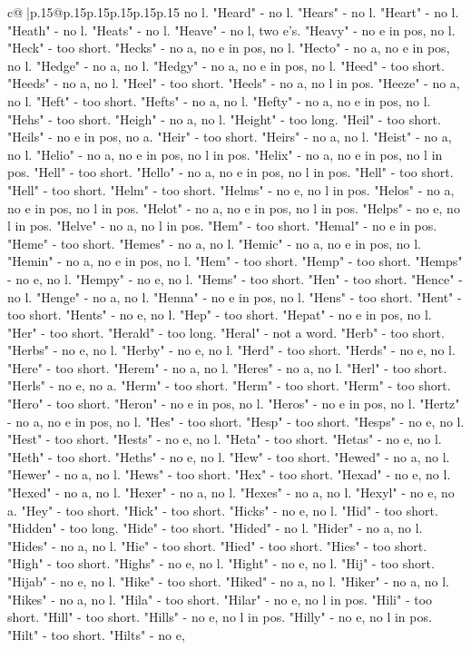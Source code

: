 \documentclass{article}
\begin{document}
{\begin{supertabular}{c@{$\;$}|p{.15\linewidth}@{}p{.15\linewidth}p{.15\linewidth}p{.15\linewidth}p{.15\linewidth}p{.15\linewidth}}
{{{no l. "Heard" {-} no l. "Hears" {-} no l. "Heart" {-} no l. "Heath" {-} no l. "Heats" {-} no l. "Heave" {-} no l, two e's. "Heavy" {-} no e in pos, no l. "Heck" {-} too short. "Hecks" {-} no a, no e in pos, no l. "Hecto" {-} no a, no e in pos, no l. "Hedge" {-} no a, no l. "Hedgy" {-} no a, no e in pos, no l. "Heed" {-} too short. "Heeds" {-} no a, no l. "Heel" {-} too short. "Heels" {-} no a, no l in pos. "Heeze" {-} no a, no l. "Heft" {-} too short. "Hefts" {-} no a, no l. "Hefty" {-} no a, no e in pos, no l. "Hehs" {-} too short. "Heigh" {-} no a, no l. "Height" {-} too long. "Heil" {-} too short. "Heils" {-} no e in pos, no a. "Heir" {-} too short. "Heirs" {-} no a, no l. "Heist" {-} no a, no l. "Helio" {-} no a, no e in pos, no l in pos. "Helix" {-} no a, no e in pos, no l in pos. "Hell" {-} too short. "Hello" {-} no a, no e in pos, no l in pos. "Hell" {-} too short. "Hell" {-} too short. "Helm" {-} too short. "Helms" {-} no e, no l in pos. "Helos" {-} no a, no e in pos, no l in pos. "Helot" {-} no a, no e in pos, no l in pos. "Helps" {-} no e, no l in pos. "Helve" {-} no a, no l in pos. "Hem" {-} too short. "Hemal" {-} no e in pos. "Heme" {-} too short. "Hemes" {-} no a, no l. "Hemic" {-} no a, no e in pos, no l. "Hemin" {-} no a, no e in pos, no l. "Hem" {-} too short. "Hemp" {-} too short. "Hemps" {-} no e, no l. "Hempy" {-} no e, no l. "Hems" {-} too short. "Hen" {-} too short. "Hence" {-} no l. "Henge" {-} no a, no l. "Henna" {-} no e in pos, no l. "Hens" {-} too short. "Hent" {-} too short. "Hents" {-} no e, no l. "Hep" {-} too short. "Hepat" {-} no e in pos, no l. "Her" {-} too short. "Herald" {-} too long. "Heral" {-} not a word. "Herb" {-} too short. "Herbs" {-} no e, no l. "Herby" {-} no e, no l. "Herd" {-} too short. "Herds" {-} no e, no l. "Here" {-} too short. "Herem" {-} no a, no l. "Heres" {-} no a, no l. "Herl" {-} too short. "Herls" {-} no e, no a. "Herm" {-} too short. "Herm" {-} too short. "Herm" {-} too short. "Hero" {-} too short. "Heron" {-} no e in pos, no l. "Heros" {-} no e in pos, no l. "Hertz" {-} no a, no e in pos, no l. "Hes" {-} too short. "Hesp" {-} too short. "Hesps" {-} no e, no l. "Hest" {-} too short. "Hests" {-} no e, no l. "Heta" {-} too short. "Hetas" {-} no e, no l. "Heth" {-} too short. "Heths" {-} no e, no l. "Hew" {-} too short. "Hewed" {-} no a, no l. "Hewer" {-} no a, no l. "Hews" {-} too short. "Hex" {-} too short. "Hexad" {-} no e, no l. "Hexed" {-} no a, no l. "Hexer" {-} no a, no l. "Hexes" {-} no a, no l. "Hexyl" {-} no e, no a. "Hey" {-} too short. "Hick" {-} too short. "Hicks" {-} no e, no l. "Hid" {-} too short. "Hidden" {-} too long. "Hide" {-} too short. "Hided" {-} no l. "Hider" {-} no a, no l. "Hides" {-} no a, no l. "Hie" {-} too short. "Hied" {-} too short. "Hies" {-} too short. "High" {-} too short. "Highs" {-} no e, no l. "Hight" {-} no e, no l. "Hij" {-} too short. "Hijab" {-} no e, no l. "Hike" {-} too short. "Hiked" {-} no a, no l. "Hiker" {-} no a, no l. "Hikes" {-} no a, no l. "Hila" {-} too short. "Hilar" {-} no e, no l in pos. "Hili" {-} too short. "Hill" {-} too short. "Hills" {-} no e, no l in pos. "Hilly" {-} no e, no l in pos. "Hilt" {-} too short. "Hilts" {-} no e, }}}
\end{supertabular}}
\end{document}
